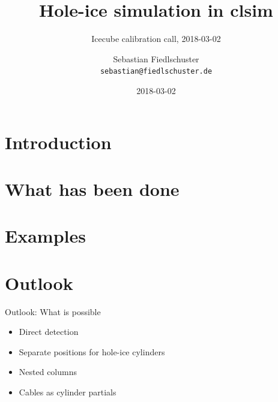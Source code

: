 \documentclass[green, 12pt]{beamer}
\title{Hole-ice simulation in clsim}
\subtitle{Icecube calibration call, 2018-03-02}
\date{2018-03-02}
\author[Sebastian Fiedlschuster \texttt{<sebastian@fiedlschuster.de>}]{Sebastian Fiedlschuster \\ \tiny\texttt{sebastian@fiedlschuster.de}}
\institute{Erlangen Centre for Astroparticle Physics}
\newif\ifplacelogo %
\begin{document}



\section{Introduction}


\placelogofalse

\section{What has been done}
%




\section{Examples}





\section{Outlook}

\begin{frame}{Outlook: What is possible}
  \begin{itemize}
    \item Direct detection
    \item Separate positions for hole-ice cylinders
    \item Nested columns
    \item Cables as cylinder partials
  \end{itemize}
\end{frame}



\end{document}

